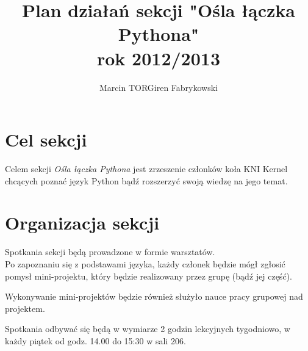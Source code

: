 \documentclass[a4paper,12pt]{article}
\title{Plan działań sekcji "Ośla łączka Pythona"\\rok 2012/2013}
\author{Marcin TORGiren Fabrykowski}
\begin{document}
\maketitle
\newpage
\section{Cel sekcji}
Celem sekcji \textit{Ośla łączka Pythona} jest zrzeszenie członków koła KNI Kernel chcących poznać język Python bądź rozszerzyć swoją wiedzę na jego temat.
\section{Organizacja sekcji}
Spotkania sekcji będą prowadzone w formie warsztatów.\\
Po zapoznaniu się z podstawami języka, każdy członek będzie mógł zgłosić pomysł mini-projektu, który będzie realizowany przez grupę (bądź jej część).

Wykonywanie mini-projektów będzie również służyło nauce pracy grupowej nad projektem.

Spotkania odbywać się będą w wymiarze 2 godzin lekcyjnych tygodniowo, w każdy piątek od godz. 14.00 do 15:30 w sali 206.
\end{document}
